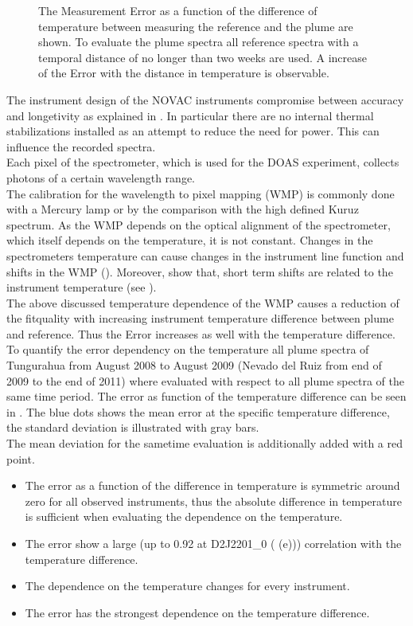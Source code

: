 \documentclass  [
  paper    = a4,
  BCOR     = 10mm,
  twoside,
  fontsize = 12pt,
  fleqn,
  toc      = bibnumbered,
  toc      = listofnumbered,
  numbers  = noendperiod,
  headings = normal,
  listof   = leveldown,
  version  = 3.03
]                                       {scrreprt}
\begin{document}
\begin{figure}
		\caption{The   Measurement Error as a function of the difference of temperature between measuring the reference and the plume are shown. To evaluate the plume spectra all reference spectra with a temporal distance of no longer than two weeks are used. A increase of the   Error with the distance in temperature is observable.}
		\label{fig:difftemp}
	\end{figure}
	The instrument design of the NOVAC instruments compromise between accuracy and longetivity as explained in . In particular there are no internal thermal stabilizations installed as an attempt to reduce the need for power. This can influence the recorded spectra.\\	
	Each pixel of the spectrometer, which is used for the DOAS experiment, collects photons of a certain wavelength range.\\
	The calibration for the wavelength to pixel mapping (WMP) is commonly done with a Mercury lamp or by the comparison with the high defined Kuruz spectrum.
	As the WMP depends on the optical alignment of the spectrometer, which itself depends on the temperature, it is not constant.
	Changes in the spectrometers temperature can cause changes in the instrument line function and shifts in the WMP (\citep{pinardi2007influence}). 
	Moreover, \cite{WarnachSimon} show that, short term shifts are related to the instrument temperature (see ).\\
	The above discussed temperature dependence of the WMP causes a reduction of the fitquality with increasing instrument temperature difference between plume and reference. Thus the  Error increases as well with the temperature difference. To quantify the  error dependency on the temperature all plume spectra of Tungurahua from August 2008 to August 2009 (Nevado del Ruiz from end of 2009 to the end of 2011) where evaluated  with respect to all plume spectra of the same time period. 
	The  error as function of the temperature difference can be seen in . The blue dots shows the mean  error at the specific temperature difference, the standard deviation is illustrated with gray bars.\\
	The mean   deviation for the sametime evaluation is additionally added with a red point.
	\begin{itemize}
		\item The   error as a function of the difference in temperature is symmetric around zero for all observed instruments, thus the absolute difference in temperature is sufficient when evaluating the dependence on the temperature.
		\item The   error show a large (up to 0.92 at D2J2201\_0 ( (e))) correlation with the temperature difference.
		\item The dependence on the temperature changes for every instrument.
		\item The  error has the strongest dependence on the temperature difference. 
	\end{itemize}
	
\end{document}
